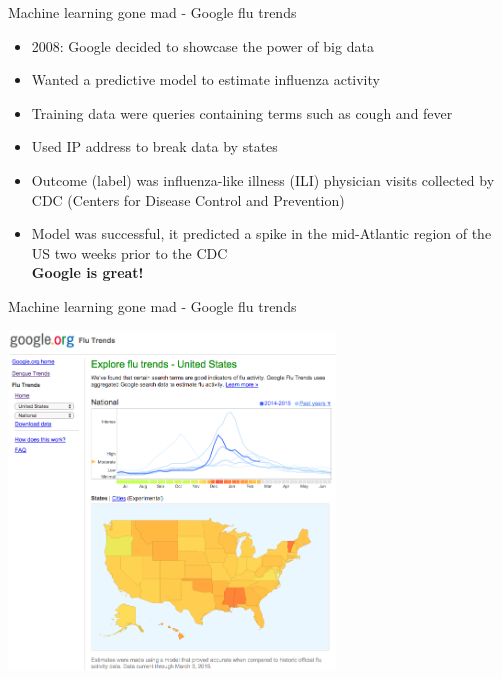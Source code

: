 \documentclass[pdf]{beamer}
\begin{document}
\begin{frame}{Machine learning gone mad - Google flu trends}
\begin{itemize}\addtolength{\itemsep}{0.5\baselineskip}
	\item<1-> 2008: Google decided to showcase the power of big data 
	\item<2-> Wanted a predictive model to estimate influenza activity	
	\item<3-> Training data were queries containing terms such as cough and fever
	\item<4-> Used IP address to break data by states
	\item<5-> Outcome (label) was influenza-like illness (ILI) physician visits collected by CDC 
	(Centers for Disease Control and Prevention)
	\item<6-> Model was successful, it predicted a spike in the mid-Atlantic region of the US two weeks prior to the CDC\\
	\textbf{Google is great!}
\end{itemize}
\end{frame}
\begin{frame}{Machine learning gone mad - Google flu trends}
\begin{center}
		\includegraphics[width=0.65\textwidth]{googleFluTrend1.png}
\end{center}
\end{frame}
\end{document}
